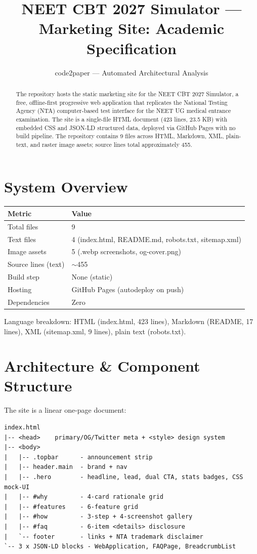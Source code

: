 \documentclass[11pt]{article}
\title{NEET CBT 2027 Simulator --- Marketing Site: Academic Specification}
\author{code2paper --- Automated Architectural Analysis}
\date{}
\begin{document}
\maketitle

\begin{abstract}
The repository hosts the static marketing site for the NEET CBT 2027 Simulator, a free,
offline-first progressive web application that replicates the National Testing Agency
(NTA) computer-based test interface for the NEET UG medical entrance examination. The site
is a single-file HTML document (423 lines, 23.5 KB) with embedded CSS and JSON-LD structured
data, deployed via GitHub Pages with no build pipeline. The repository contains 9 files
across HTML, Markdown, XML, plain-text, and raster image assets; source lines total
approximately 455.
\end{abstract}

\section{System Overview}
\begin{table}[h]
\centering
\begin{tabular}{ll}
\toprule
\textbf{Metric} & \textbf{Value} \\
\midrule
Total files & 9 \\
Text files & 4 (index.html, README.md, robots.txt, sitemap.xml) \\
Image assets & 5 (.webp screenshots, og-cover.png) \\
Source lines (text) & $\sim$455 \\
Build step & None (static) \\
Hosting & GitHub Pages (autodeploy on push) \\
Dependencies & Zero \\
\bottomrule
\end{tabular}
\end{table}

Language breakdown: HTML (index.html, 423 lines), Markdown (README, 17 lines), XML
(sitemap.xml, 9 lines), plain text (robots.txt).

\section{Architecture \& Component Structure}
The site is a linear one-page document:

\begin{verbatim}
index.html
|-- <head>    primary/OG/Twitter meta + <style> design system
|-- <body>
|   |-- .topbar      - announcement strip
|   |-- header.main  - brand + nav
|   |-- .hero        - headline, lead, dual CTA, stats badges, CSS mock-UI
|   |-- #why         - 4-card rationale grid
|   |-- #features    - 6-feature grid
|   |-- #how         - 3-step + 4-screenshot gallery
|   |-- #faq         - 6-item <details> disclosure
|   `-- footer       - links + NTA trademark disclaimer
`-- 3 x JSON-LD blocks - WebApplication, FAQPage, BreadcrumbList
\end{verbatim}
\end{document}
